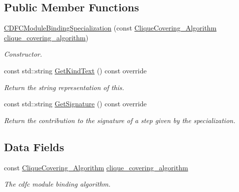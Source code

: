 \subsection*{Public Member Functions}
\begin{DoxyCompactItemize}
\item 
\hyperlink{classCDFCModuleBindingSpecialization_a5b9c2b00f88126fec762d122761741f0}{C\+D\+F\+C\+Module\+Binding\+Specialization} (const \hyperlink{clique__covering_8hpp_acc23ade19dac4d6935b7792353e207d9}{Clique\+Covering\+\_\+\+Algorithm} \hyperlink{classCDFCModuleBindingSpecialization_a55252a5ffbf6a0bb09c6f5165e04e75e}{clique\+\_\+covering\+\_\+algorithm})
\begin{DoxyCompactList}\small\item\em Constructor. \end{DoxyCompactList}\item 
const std\+::string \hyperlink{classCDFCModuleBindingSpecialization_a1696e824eb66cbcf6b94992c2bddf943}{Get\+Kind\+Text} () const override
\begin{DoxyCompactList}\small\item\em Return the string representation of this. \end{DoxyCompactList}\item 
const std\+::string \hyperlink{classCDFCModuleBindingSpecialization_a2e211cebee02224677080272887e4cca}{Get\+Signature} () const override
\begin{DoxyCompactList}\small\item\em Return the contribution to the signature of a step given by the specialization. \end{DoxyCompactList}\end{DoxyCompactItemize}
\subsection*{Data Fields}
\begin{DoxyCompactItemize}
\item 
const \hyperlink{clique__covering_8hpp_acc23ade19dac4d6935b7792353e207d9}{Clique\+Covering\+\_\+\+Algorithm} \hyperlink{classCDFCModuleBindingSpecialization_a55252a5ffbf6a0bb09c6f5165e04e75e}{clique\+\_\+covering\+\_\+algorithm}
\begin{DoxyCompactList}\small\item\em The cdfc module binding algorithm. \end{DoxyCompactList}\end{DoxyCompactItemize}


